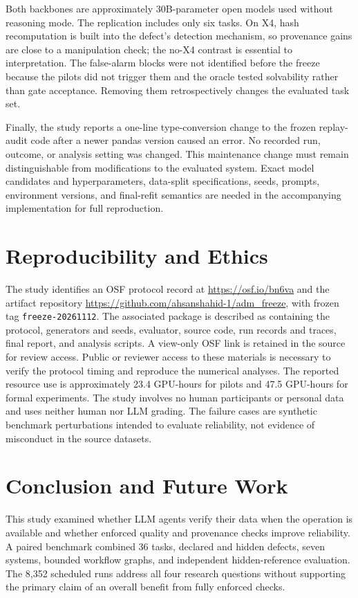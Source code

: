 \documentclass[conference]{IEEEtran}
\newcommand{\code}[1]{\texttt{#1}}
\begin{document}
Both backbones are approximately 30B-parameter open models used without reasoning mode. The replication includes only six tasks. On X4, hash recomputation is built into the defect's detection mechanism, so provenance gains are close to a manipulation check; the no-X4 contrast is essential to interpretation. The false-alarm blocks were not identified before the freeze because the pilots did not trigger them and the oracle tested solvability rather than gate acceptance. Removing them retrospectively changes the evaluated task set.

Finally, the study reports a one-line type-conversion change to the frozen replay-audit code after a newer pandas version caused an error. No recorded run, outcome, or analysis setting was changed. This maintenance change must remain distinguishable from modifications to the evaluated system. Exact model candidates and hyperparameters, data-split specifications, seeds, prompts, environment versions, and final-refit semantics are needed in the accompanying implementation for full reproduction.

\section{Reproducibility and Ethics}
The study identifies an OSF protocol record at \url{https://osf.io/bn6va} and the artifact repository \url{https://github.com/ahsanshahid-1/adm_freeze}, with frozen tag \code{freeze-20261112}. The associated package is described as containing the protocol, generators and seeds, evaluator, source code, run records and traces, final report, and analysis scripts. A view-only OSF link is retained in the source for review access. Public or reviewer access to these materials is necessary to verify the protocol timing and reproduce the numerical analyses.
The reported resource use is approximately 23.4 GPU-hours for pilots and 47.5 GPU-hours for formal experiments. The study involves no human participants or personal data and uses neither human nor LLM grading. The failure cases are synthetic benchmark perturbations intended to evaluate reliability, not evidence of misconduct in the source datasets.

\section{Conclusion and Future Work}
This study examined whether LLM agents verify their data when the operation is available and whether enforced quality and provenance checks improve reliability. A paired benchmark combined 36 tasks, declared and hidden defects, seven systems, bounded workflow graphs, and independent hidden-reference evaluation. The 8,352 scheduled runs address all four research questions without supporting the primary claim of an overall benefit from fully enforced checks.
\end{document}

